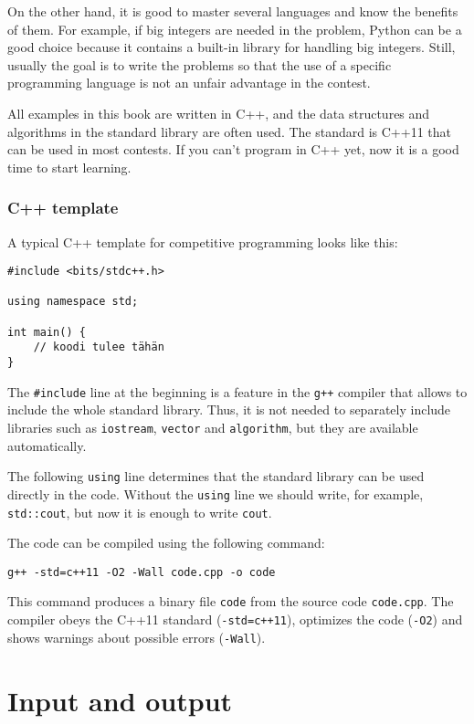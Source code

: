 On the other hand, it is good to
master several languages and know the
benefits of them.
For example, if big integers are needed
in the problem,
Python can be a good choice because it
contains a built-in library for handling
big integers.
Still, usually the goal is to write the problems so that
the use of a specific programming language
is not an unfair advantage in the contest.

All examples in this book are written in C++,
and the data structures and algorithms in
the standard library are often used.
The standard is C++11 that can be used in most
contests.
If you can't program in C++ yet,
now it is a good time to start learning.

\subsubsection{C++ template}

A typical C++ template for competitive programming
looks like this:

\begin{lstlisting}
#include <bits/stdc++.h>

using namespace std;

int main() {
    // koodi tulee tähän
}
\end{lstlisting}

The \texttt{\#include} line at the beginning
is a feature in the \texttt{g++} compiler
that allows to include the whole standard library.
Thus, it is not needed to separately include
libraries such as \texttt{iostream},
\texttt{vector} and \texttt{algorithm},
but they are available automatically.

The following \texttt{using} line determines
that the standard library can be used directly
in the code.
Without the \texttt{using} line we should write,
for example, \texttt{std::cout},
but now it is enough to write \texttt{cout}.

The code can be compiled using the following command:

\begin{lstlisting}
g++ -std=c++11 -O2 -Wall code.cpp -o code
\end{lstlisting}

This command produces a binary file \texttt{code}
from the source code \texttt{code.cpp}.
The compiler obeys the C++11 standard
(\texttt{-std=c++11}),
optimizes the code (\texttt{-O2})
and shows warnings about possible errors (\texttt{-Wall}).

\section{Input and output}

